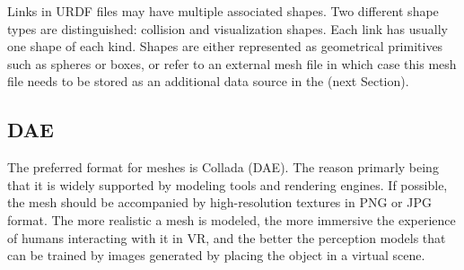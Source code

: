 Links in URDF files may have multiple associated shapes.
Two different shape types are distinguished: collision and visualization shapes.
Each link has usually one shape of each kind.
Shapes are either represented as geometrical primitives such as spheres or boxes, or refer to an external mesh file in which case this mesh file needs to be stored as an additional data source in the \neembak (next Section).

\subsection{DAE}
\label{sec:background:dae}

The preferred format for meshes is Collada (DAE).
The reason primarly being that it is widely supported by modeling tools and rendering engines.
If possible, the mesh should be accompanied by high-resolution textures in PNG or JPG format.
The more realistic a mesh is modeled, the more immersive the experience of humans interacting with it in VR, and the better the perception models that can be trained by images generated by placing the object in a virtual scene.

